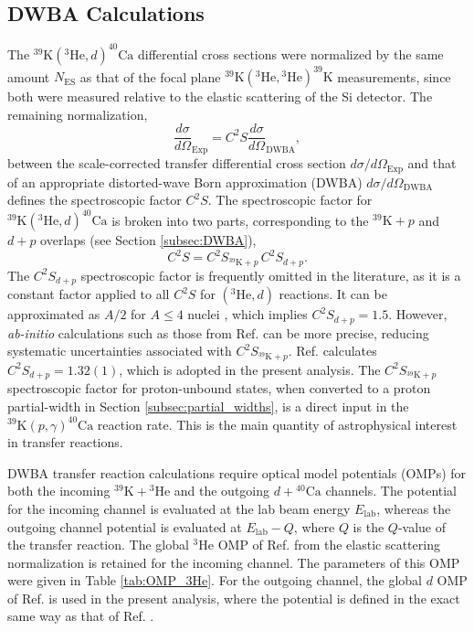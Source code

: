 \newpage

\subsection{DWBA Calculations} \label{subsec:DWBA_Cross}

The $^{39}\mathrm{K}(^{3}\mathrm{He},d)^{40}\mathrm{Ca}$ differential cross sections were normalized by the same amount $N_{\mathrm{ES}}$ as that of the focal plane $^{39}\mathrm{K}(^{3}\mathrm{He}, {}^{3}\mathrm{He})^{39}\mathrm{K}$ measurements, since both were measured relative to the elastic scattering of the Si detector. The remaining normalization,
\begin{equation} \label{eqn:spec_factor_dwba}
\frac{d\sigma}{d\Omega}_{\mathrm{Exp}} = C^{2}S \frac{d\sigma}{d\Omega}_{\mathrm{DWBA}},
\end{equation}
between the scale-corrected transfer differential cross section $d\sigma/d\Omega_{\mathrm{Exp}}$ and that of an appropriate distorted-wave Born approximation (DWBA) $d\sigma/d\Omega_{\mathrm{DWBA}}$ defines the spectroscopic factor $C^{2}S$. The spectroscopic factor for $^{39}\mathrm{K}(^{3}\mathrm{He},d)^{40}\mathrm{Ca}$ is broken into two parts, corresponding to the $^{39}\mathrm{K}+p$ and $d+p$ overlaps (see Section \ref{subsec:DWBA}),
\begin{equation}
C^{2}S = C^{2}S_{^{39}\mathrm{K}+p} \, C^{2}S_{d+p}.
\end{equation}
The $C^{2}S_{d+p}$ spectroscopic factor is frequently omitted in the literature, as it is a constant factor applied to all $C^{2}S$ for $(^{3}\mathrm{He},d)$ reactions. It can be approximated as $A/2$ for $A \leq 4$ nuclei \cite{Satchler1988}, which implies $C^{2}S_{d+p} = 1.5$. However, \emph{ab-initio} calculations such as those from Ref. \cite{Brida2011} can be more precise, reducing systematic uncertainties associated with $C^{2}S_{^{39}\mathrm{K}+p}$. Ref. \cite{Brida2011} calculates $C^{2}S_{d+p} = 1.32(1)$, which is adopted in the present analysis. The $C^{2}S_{^{39}\mathrm{K}+p}$ spectroscopic factor for proton-unbound states, when converted to a proton partial-width in Section \ref{subsec:partial_widths}, is a direct input in the $^{39}\mathrm{K}(p,\gamma)^{40}\mathrm{Ca}$ reaction rate. This is the main quantity of astrophysical interest in transfer reactions.

DWBA transfer reaction calculations require optical model potentials (OMPs) for both the incoming $^{39}\mathrm{K} + {}^{3}\mathrm{He}$ and the outgoing $d + {}^{40}\mathrm{Ca}$ channels. The potential for the incoming channel is evaluated at the lab beam energy $E_{\mathrm{lab}}$, whereas the outgoing channel potential is evaluated at $E_{\mathrm{lab}} - Q$, where $Q$ is the $Q$-value of the transfer reaction. The global $^{3}$He OMP of Ref. \cite{Liang2009} from the elastic scattering normalization is retained for the incoming channel. The parameters of this OMP were given in Table \ref{tab:OMP_3He}. For the outgoing channel, the global $d$ OMP of Ref. \cite{An2006} is used in the present analysis, where the potential is defined in the exact same way as that of Ref. \cite{Liang2009}.

